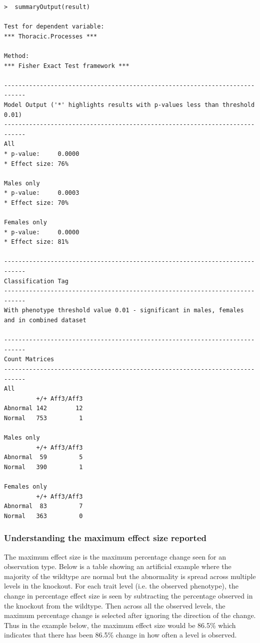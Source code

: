 \documentclass[12pt,a4paper]{article}
\begin{document}
\begingroup
    \fontsize{8pt}{12pt}\selectfont
\begin{verbatim}
>  summaryOutput(result)

Test for dependent variable:
*** Thoracic.Processes ***

Method:
*** Fisher Exact Test framework ***

----------------------------------------------------------------------------
Model Output ('*' highlights results with p-values less than threshold 0.01)
----------------------------------------------------------------------------
All
* p-value:     0.0000
* Effect size: 76%   

Males only                     
* p-value:     0.0003
* Effect size: 70%   

Females only                 
* p-value:     0.0000
* Effect size: 81%   

----------------------------------------------------------------------------
Classification Tag
----------------------------------------------------------------------------
With phenotype threshold value 0.01 - significant in males, females and in combined dataset

----------------------------------------------------------------------------
Count Matrices
----------------------------------------------------------------------------
All
         +/+ Aff3/Aff3
Abnormal 142        12
Normal   753         1

Males only
         +/+ Aff3/Aff3
Abnormal  59         5
Normal   390         1

Females only
         +/+ Aff3/Aff3
Abnormal  83         7
Normal   363         0
\end{verbatim}
\endgroup 


\subsubsection{Understanding the maximum effect size reported}
\label{FE_EffectSize}
The maximum effect size is the maximum percentage change seen for an observation type. 
Below is a table showing an artificial example where the majority of the wildtype are normal but the abnormality is spread across multiple levels in the knockout. 
For each trait level (i.e. the observed phenotype), the change in percentage effect size is seen by subtracting the percentage observed in the knockout from the wildtype. 
Then across all the observed levels, the maximum percentage change is selected after ignoring the direction of the change. 
Thus in the example below, the maximum effect size would be 86.5\% which indicates that there has been 86.5\% change in how often a level is observed.
\end{document}
